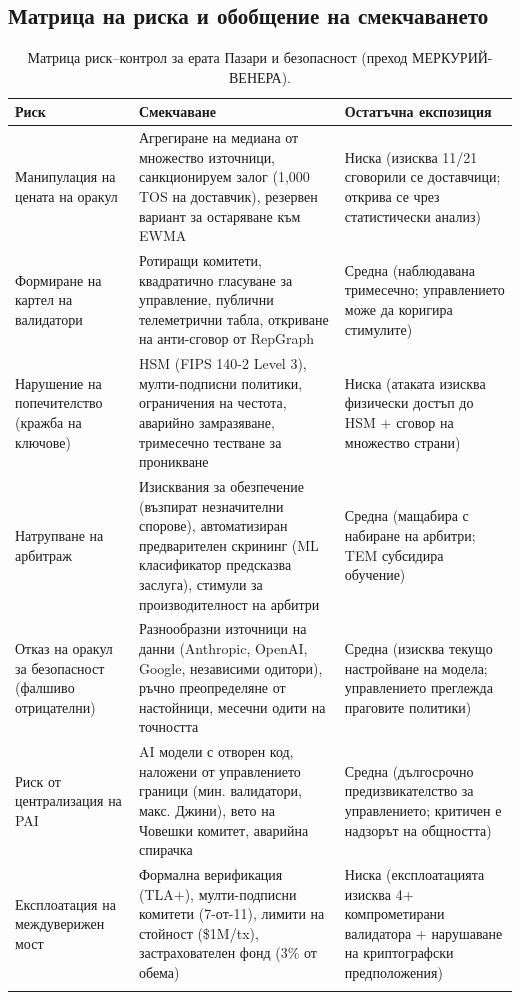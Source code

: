 \documentclass[11pt]{article}
\begin{document}
\subsection{Матрица на риска и обобщение на смекчаването}
\begin{longtable}{@{}p{}p{}p{}@{}}
\toprule
\textbf{Риск} & \textbf{Смекчаване} & \textbf{Остатъчна експозиция} \\\midrule
Манипулация на цената на оракул & Агрегиране на медиана от множество източници, санкционируем залог (1,000 TOS на доставчик), резервен вариант за остаряване към EWMA & Ниска (изисква 11/21 сговорили се доставчици; открива се чрез статистически анализ) \\
Формиране на картел на валидатори & Ротиращи комитети, квадратично гласуване за управление, публични телеметрични табла, откриване на анти-сговор от RepGraph & Средна (наблюдавана тримесечно; управлението може да коригира стимулите) \\
Нарушение на попечителство (кражба на ключове) & HSM (FIPS 140-2 Level 3), мулти-подписни политики, ограничения на честота, аварийно замразяване, тримесечно тестване за проникване & Ниска (атаката изисква физически достъп до HSM + сговор на множество страни) \\
Натрупване на арбитраж & Изисквания за обезпечение (възпират незначителни спорове), автоматизиран предварителен скрининг (ML класификатор предсказва заслуга), стимули за производителност на арбитри & Средна (мащабира с набиране на арбитри; TEM субсидира обучение) \\
Отказ на оракул за безопасност (фалшиво отрицателни) & Разнообразни източници на данни (Anthropic, OpenAI, Google, независими одитори), ръчно преопределяне от настойници, месечни одити на точността & Средна (изисква текущо настройване на модела; управлението преглежда праговите политики) \\
Риск от централизация на PAI & AI модели с отворен код, наложени от управлението граници (мин. валидатори, макс. Джини), вето на Човешки комитет, аварийна спирачка & Средна (дългосрочно предизвикателство за управлението; критичен е надзорът на общността) \\
Експлоатация на междуверижен мост & Формална верификация (TLA+), мулти-подписни комитети (7-от-11), лимити на стойност (\$1M/tx), застрахователен фонд (3\% от обема) & Ниска (експлоатацията изисква 4+ компрометирани валидатора + нарушаване на криптографски предположения) \\\bottomrule
\caption{Матрица риск--контрол за ерата Пазари и безопасност (преход МЕРКУРИЙ-ВЕНЕРА).}
\label{tab:risk-markets-expanded}
\end{longtable}
\end{document}
